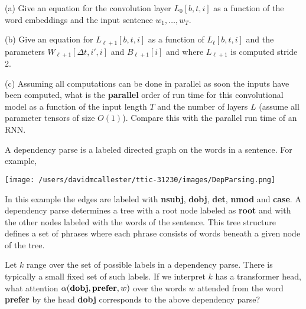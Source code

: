 \documentclass{article}
\newcommand{\solution}[1]{}
\begin{document}
\medskip
(a) Give an equation for the convolution layer $L_0[b,t,i]$ as a function of the word embeddings and the input sentence $w_1,\ldots,w_T$.

\solution{
  $$L_0[b,t,i] = e[w[b,t],i]$$}

\medskip
(b) Give an equation for $L_{\ell+1}[b,t,i]$ as a function of $L_\ell[b,t,i]$ and the parameters $W_{\ell+1}[\Delta t,i',i]$ and $B_{\ell+1}[i]$
and where $L_{\ell+1}$ is computed stride 2.

\solution{
$$L_{\ell+1}[b,t,i] = \sigma\left(\left(\sum_{\Delta t,i'}\;W_{\ell+1}[\Delta t,i',i]L_\ell[2t + \Delta t,i']\right) - B_{\ell+1}[i]\right)$$
}
  
\medskip
(c) Assuming all computations can be done in parallel as soon the inputs have been computed, what is the {\bf parallel} order
of run time for this convolutional model as a function of the input length $T$ and the number of layers $L$ (assume all parameter tensors
of size $O(1)$). Compare this with the parallel run time of an RNN.

\solution{The CNN has $O(L)$ parallel run time while the RNN is $O(T)$ or $O(T+L)$ with $L$ layers of RNN.}

 A dependency parse is a labeled directed graph on the words in a sentence.
For example,

\centerline{\texttt{[image: /users/davidmcallester/ttic-31230/images/DepParsing.png]}}

\medskip
In this example the edges are labeled with {\bf nsubj}, {\bf dobj}, {\bf det}, {\bf nmod} and {\bf case}.
A dependency parse determines a tree with a root node labeled as {\bf root} and with the other nodes labeled with the words of the sentence.
This tree structure defines a set of phrases where each phrase
consists of words beneath a given node of the tree.

 Let $k$ range over the set of possible labels in a dependency parse.  There is typically a small fixed set of such labels.
If we interpret $k$ has a transformer head, what attention $\alpha({\mbox{\bf dobj}},{\bf prefer},w)$ over the words $w$ attended from the word {\bf prefer} by the head
{\bf dobj} corresponds to the above dependency parse?

\solution{
  $$\alpha({\bf dobj},{\bf prefer},w) = \left\{\begin{array}{rl} 1 & \mbox{if $w$ is {\bf flight}} \\ 0 & \mbox{otherwise}\end{array}\right.$$
  }
\end{document}
